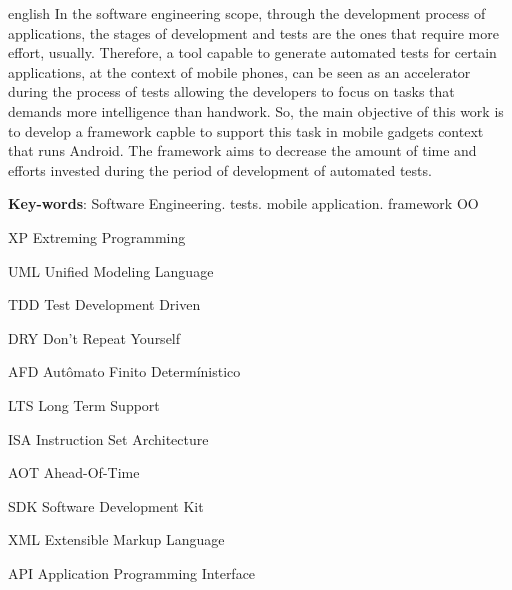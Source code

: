 \documentclass[
    12pt,       %
    openright,      %
    twoside,      %
    a4paper,      %
    english,      %
    french,       %
    spanish,      %
    brazil,       %
    ]{abntex2}
\begin{document}
  \begin{resumo}[Abstract]
   \begin{otherlanguage*}{english}
     In the software engineering scope, through the development process of
     applications, the stages of development and tests are the
     ones that require more effort, usually. Therefore, a tool capable to generate
     automated tests for certain applications, at the context of mobile
     phones, can be seen as an accelerator during the process of
     tests allowing the developers to focus on tasks that demands
     more intelligence than handwork. So, the main objective of this work
     is to develop a framework capble to support this task in mobile
     gadgets context that runs Android. The framework aims to decrease the amount of
     time and efforts invested during the period of development of automated tests.

     \vspace{\onelineskip}

     \noindent
     \textbf{Key-words}: Software Engineering. tests. mobile application. framework OO
   \end{otherlanguage*}
  \end{resumo}

  \listoffigures*
  \cleardoublepage

  \listoftables*
  \cleardoublepage

  \begin{siglas}
    \item[XP] Extreming Programming
    \item[UML] Unified Modeling Language
    \item[TDD] Test Development Driven
    \item[DRY] Don't Repeat Yourself
    \item[AFD] Autômato Finito Determínistico
    \item[LTS] Long Term Support
    \item[ISA] Instruction Set Architecture
    \item[AOT] Ahead-Of-Time
    \item[SDK] Software Development Kit
    \item[XML] Extensible Markup Language
    \item[API] Application Programming Interface
  \end{siglas}
\end{document}
